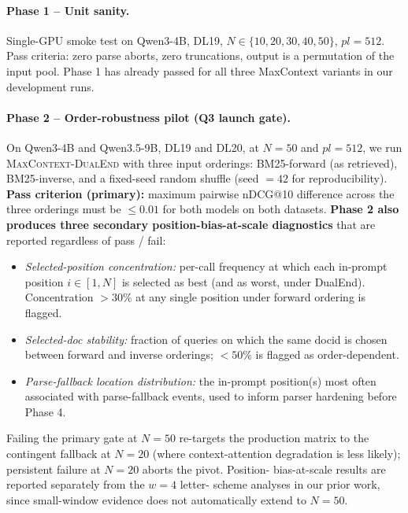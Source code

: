 \paragraph{Phase 1 -- Unit sanity.}
Single-GPU smoke test on Qwen3-4B, DL19, $N \in \{10,20,30,40,50\}$, $pl=512$.
Pass criteria: zero parse aborts, zero truncations, output is a permutation
of the input pool. Phase 1 has already passed for all three MaxContext
variants in our development runs.

\paragraph{Phase 2 -- Order-robustness pilot (Q3 launch gate).}
On Qwen3-4B and Qwen3.5-9B, DL19 and DL20, at $N{=}50$ and $pl{=}512$, we
run \textsc{MaxContext-DualEnd} with three input orderings: BM25-forward (as
retrieved), BM25-inverse, and a fixed-seed random shuffle (seed $\!=\!42$
for reproducibility). \textbf{Pass criterion (primary):} maximum pairwise
nDCG@10 difference across the three orderings must be $\leq 0.01$ for both
models on both datasets. \textbf{Phase 2 also produces three secondary
position-bias-at-scale diagnostics} that are reported regardless of pass /
fail:
\begin{itemize}
\item \textit{Selected-position concentration:} per-call frequency at which
each in-prompt position $i \in [1, N]$ is selected as best (and as worst,
under DualEnd). Concentration $> 30\%$ at any single position under
forward ordering is flagged.
\item \textit{Selected-doc stability:} fraction of queries on which the
same docid is chosen between forward and inverse orderings; $< 50\%$ is
flagged as order-dependent.
\item \textit{Parse-fallback location distribution:} the in-prompt
position(s) most often associated with parse-fallback events, used to
inform parser hardening before Phase 4.
\end{itemize}
Failing the primary gate at $N{=}50$ re-targets the production matrix to
the contingent fallback at $N{=}20$ (where context-attention degradation is
less likely); persistent failure at $N{=}20$ aborts the pivot. Position-
bias-at-scale results are reported separately from the $w{=}4$ letter-
scheme analyses in our prior work, since small-window evidence does not
automatically extend to $N{=}50$.

